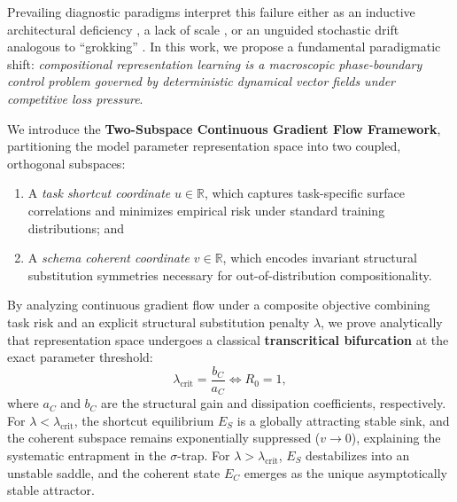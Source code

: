 \documentclass{article}
\theoremstyle{plain}
\theoremstyle{definition}
\begin{document}
Prevailing diagnostic paradigms interpret this failure either as an inductive architectural deficiency \citep{Lake2018Generalization,Kazemnejad2023Impact}, a lack of scale \citep{Drozdov2022Compositional}, or an unguided stochastic drift analogous to ``grokking'' \citep{Power2022Grokking,Liu2022Grokking,Nakkiran2021Deep,Varma2023Explaining}. In this work, we propose a fundamental paradigmatic shift: \emph{compositional representation learning is a macroscopic phase-boundary control problem governed by deterministic dynamical vector fields under competitive loss pressure}.

We introduce the \textbf{Two-Subspace Continuous Gradient Flow Framework}, partitioning the model parameter representation space into two coupled, orthogonal subspaces:
\begin{enumerate}[leftmargin=*,noitemsep]
    \item A \emph{task shortcut coordinate} $u \in \mathbb{R}$, which captures task-specific surface correlations and minimizes empirical risk under standard training distributions; and
    \item A \emph{schema coherent coordinate} $v \in \mathbb{R}$, which encodes invariant structural substitution symmetries necessary for out-of-distribution compositionality.
\end{enumerate}

By analyzing continuous gradient flow under a composite objective combining task risk and an explicit structural substitution penalty $\lambda$, we prove analytically that representation space undergoes a classical \textbf{transcritical bifurcation} at the exact parameter threshold:
\begin{equation}
    \lambda_{\text{crit}} = \frac{b_C}{a_C} \iff R_0 = 1,
    \label{eq:critical_law_intro}
\end{equation}
where $a_C$ and $b_C$ are the structural gain and dissipation coefficients, respectively. For $\lambda < \lambda_{\text{crit}}$, the shortcut equilibrium $E_S$ is a globally attracting stable sink, and the coherent subspace remains exponentially suppressed ($v \to 0$), explaining the systematic entrapment in the $\sigma$-trap. For $\lambda > \lambda_{\text{crit}}$, $E_S$ destabilizes into an unstable saddle, and the coherent state $E_C$ emerges as the unique asymptotically stable attractor.
\end{document}

